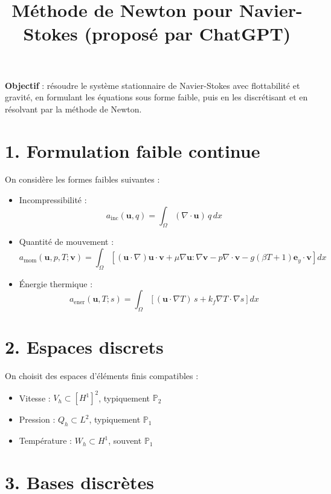 \documentclass[11pt]{article}
\title{Méthode de Newton pour Navier-Stokes \footnotesize(proposé par ChatGPT)}
\author{}
\date{}
\begin{document}
\maketitle

\textbf{Objectif} : résoudre le système stationnaire de Navier-Stokes avec flottabilité et gravité, en formulant les équations sous forme faible, puis en les discrétisant et en résolvant par la méthode de Newton.

\section*{1. Formulation faible continue}

On considère les formes faibles suivantes :\\

\begin{itemize}
  \item Incompressibilité :
  \[
  a_{\text{inc}}(\mathbf{u}, q) = \int_\Omega (\nabla \cdot \mathbf{u}) \, q \, dx
  \]
  \item Quantité de mouvement :
  \[
  a_{\text{mom}}(\mathbf{u}, p, T; \mathbf{v}) = \int_\Omega \left[ (\mathbf{u} \cdot \nabla)\mathbf{u} \cdot \mathbf{v} + \mu \nabla \mathbf{u} : \nabla \mathbf{v} - p \nabla \cdot \mathbf{v} - g(\beta T + 1)\mathbf{e}_y \cdot \mathbf{v} \right] dx
  \]
  \item Énergie thermique :
  \[
  a_{\text{ener}}(\mathbf{u}, T; s) = \int_\Omega \left[ (\mathbf{u} \cdot \nabla T) \, s + k_f \nabla T \cdot \nabla s \right] dx
  \]
\end{itemize}

\section*{2. Espaces discrets}

On choisit des espaces d’éléments finis compatibles :

\begin{itemize}
  \item Vitesse : \( V_h \subset [H^1]^2 \), typiquement \( \mathbb{P}_2 \)
  \item Pression : \( Q_h \subset L^2 \), typiquement \( \mathbb{P}_1 \)
  \item Température : \( W_h \subset H^1 \), souvent \( \mathbb{P}_1 \)
\end{itemize}

\section*{3. Bases discrètes}
\end{document}
